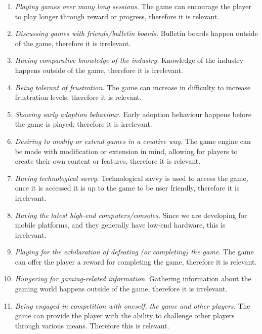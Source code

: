 \begin{enumerate}
\item \emph{Playing games over many long sessions.}
The game can encourage the player to play longer through reward or progress, therefore it is relevant.

\item \emph{Discussing games with friends/bulletin boards.}
Bulletin boards happen outside of the game, therefore it is irrelevant. 

\item \emph{Having comparative knowledge of the industry.}
Knowledge of the industry happens outside of the game, therefore it is irrelevant.

\item \emph{Being tolerant of frustration.}
The game can increase in difficulty to increase frustration levels, therefore it is relevant.

\item \emph{Showing early adoption behaviour.}
Early adoption behaviour happens before the game is played, therefore it is irrelevant.

\item \emph{Desiring to modify or extend games in a creative way.}
The game engine can be made with modification or extension in mind, allowing for players to create their own content or features, therefore it is relevant.

\item \emph{Having technological savvy.}
Technological savvy is used to access the game, once it is accessed it is up to the game to be user friendly, therefore it is irrelevant.

\item \emph{Having the latest high-end computers/consoles.}
Since we are developing for mobile platforms, and they generally have low-end hardware, this is irrelevant.

\item \emph{Playing for the exhilaration of defeating (or completing) the game.}
The game can offer the player a reward for completing the game, therefore it is relevant.

\item \emph{Hungering for gaming-related information.}
Gathering information about the gaming world happens outside of the game, therefore it is irrelevant.

\item \emph{Being engaged in competition with oneself, the game and other players.}
The game can provide the player with the ability to challenge other players through various means. Therefore this is relevant.


\end{enumerate}
